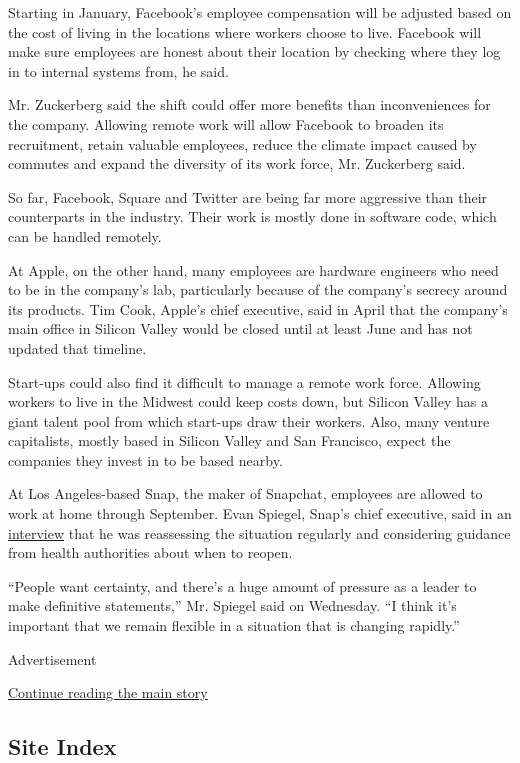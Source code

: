 Starting in January, Facebook's employee compensation will be adjusted
based on the cost of living in the locations where workers choose to
live. Facebook will make sure employees are honest about their location
by checking where they log in to internal systems from, he said.

Mr. Zuckerberg said the shift could offer more benefits than
inconveniences for the company. Allowing remote work will allow Facebook
to broaden its recruitment, retain valuable employees, reduce the
climate impact caused by commutes and expand the diversity of its work
force, Mr. Zuckerberg said.

So far, Facebook, Square and Twitter are being far more aggressive than
their counterparts in the industry. Their work is mostly done in
software code, which can be handled remotely.

At Apple, on the other hand, many employees are hardware engineers who
need to be in the company's lab, particularly because of the company's
secrecy around its products. Tim Cook, Apple's chief executive, said in
April that the company's main office in Silicon Valley would be closed
until at least June and has not updated that timeline.

Start-ups could also find it difficult to manage a remote work force.
Allowing workers to live in the Midwest could keep costs down, but
Silicon Valley has a giant talent pool from which start-ups draw their
workers. Also, many venture capitalists, mostly based in Silicon Valley
and San Francisco, expect the companies they invest in to be based
nearby.

At Los Angeles-based Snap, the maker of Snapchat, employees are allowed
to work at home through September. Evan Spiegel, Snap's chief executive,
said in an
\href{https://www.nytimes.com/2020/05/21/technology/robot-deliveries.html}{interview}
that he was reassessing the situation regularly and considering guidance
from health authorities about when to reopen.

``People want certainty, and there's a huge amount of pressure as a
leader to make definitive statements,'' Mr. Spiegel said on Wednesday.
``I think it's important that we remain flexible in a situation that is
changing rapidly.''

Advertisement

\protect\hyperlink{after-bottom}{Continue reading the main story}

\hypertarget{site-index}{%
\subsection{Site Index}\label{site-index}}

